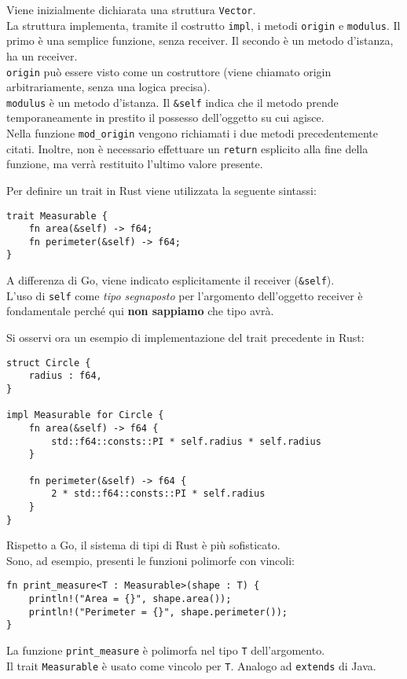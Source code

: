 \documentclass{article}
\begin{document}
Viene inizialmente dichiarata una struttura \texttt{Vector}.\\
La struttura implementa, tramite il costrutto \texttt{impl}, i metodi \texttt{origin} e \texttt{modulus}. Il primo è una semplice funzione, senza receiver. Il secondo è un metodo d'istanza, ha un receiver. \\
\texttt{origin} può essere visto come un costruttore (viene chiamato origin arbitrariamente, senza una logica precisa).\\
\texttt{modulus} è un metodo d'istanza. Il \texttt{\&self} indica che il metodo prende temporaneamente in prestito il possesso dell'oggetto su cui agisce.\\
Nella funzione \texttt{mod\_origin} vengono richiamati i due metodi precedentemente citati. Inoltre, non è necessario effettuare un \texttt{return} esplicito alla fine della funzione, ma verrà restituito l'ultimo valore presente.

\pagebreak

Per definire un trait in Rust viene utilizzata la seguente sintassi:
\begin{tcolorbox}
\begin{verbatim}
trait Measurable {
    fn area(&self) -> f64;
    fn perimeter(&self) -> f64;
}
\end{verbatim}
\end{tcolorbox}
A differenza di Go, viene indicato esplicitamente il receiver (\texttt{\&self}).\\
L'uso di \texttt{self} come \textit{tipo segnaposto} per l’argomento dell’oggetto receiver è fondamentale perché qui \textbf{non sappiamo} che tipo avrà.

Si osservi ora un esempio di implementazione del trait precedente in Rust:
\begin{tcolorbox}
\begin{verbatim}
struct Circle {
    radius : f64,
}

impl Measurable for Circle {
    fn area(&self) -> f64 {
        std::f64::consts::PI * self.radius * self.radius
    }

    fn perimeter(&self) -> f64 {
        2 * std::f64::consts::PI * self.radius
    }
}
\end{verbatim}
\end{tcolorbox}
\vspace{14pt}
Rispetto a Go, il sistema di tipi di Rust è più sofisticato.\\
Sono, ad esempio, presenti le funzioni polimorfe con vincoli:
\begin{tcolorbox}
\begin{verbatim}
fn print_measure<T : Measurable>(shape : T) {
    println!("Area = {}", shape.area());
    println!("Perimeter = {}", shape.perimeter());
}
\end{verbatim}
\end{tcolorbox}
La funzione \texttt{print\_measure} è polimorfa nel tipo \texttt{T} dell’argomento.\\
Il trait \texttt{Measurable} è usato come vincolo per \texttt{T}. Analogo ad \texttt{extends} di Java.
\end{document}
